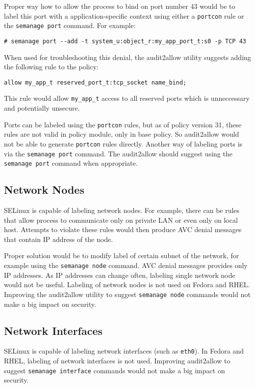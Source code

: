 Proper way how to allow the process to bind on port number 43 would be to label
this port with a application-specific context using either a \texttt{portcon}
rule or the \texttt{semanage port} command. For example:
\begin{lstlisting}
# semanage port --add -t system_u:object_r:my_app_port_t:s0 -p TCP 43
\end{lstlisting}

When used for troubleshooting this denial, the audit2allow utility suggests
adding the following rule to the policy:
\begin{lstlisting}[language=te]
allow my_app_t reserved_port_t:tcp_socket name_bind;
\end{lstlisting}
This rule would allow \texttt{my\_app\_t} access to all reserved ports which is
unneccessary and potentially unsecure.

Ports can be labeled using the \texttt{portcon} rules, but as of policy version
31, these rules are not valid in policy module, only in base policy. So
audit2allow would not be able to generate \texttt{portcon} rules directly.
Another way of labeling ports is via the \texttt{semanage port} command. The
audit2allow should suggest using the \texttt{semanage port} command when
appropriate.

\subsection{Network Nodes}
SELinux is capable of labeling network nodes. For example, there can be rules
that allow process to communicate only on private LAN or even only on local
host. Attempts to violate these rules would then produce AVC denial messages
that contain IP address of the node.

Proper solution would be to modify label of certain subnet of the network, for
example using the \texttt{semanage node} command. AVC denial messages provides
only IP addresses. As IP addresses can change often, labeling single network
node would not be useful. Labeling of network nodes is not used on Fedora and
RHEL. Improving the audit2allow utility to suggest \texttt{semanage node}
commands would not make a big impact on security.

\subsection{Network Interfaces}
SELinux is capable of labeling network interfaces (such as \texttt{eth0}). In
Fedora and RHEL, labeling of network interfaces is not used. Improving
audit2allow to suggest \texttt{semanage interface} commands would not make a big
impact on security.

